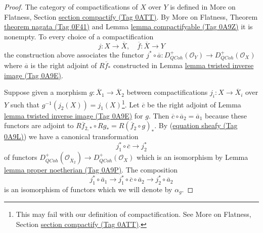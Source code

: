 \documentclass{amsart}
\theoremstyle{plain}
\theoremstyle{definition}
\theoremstyle{remark}
\numberwithin{equation}{subsection}
\def\QCoh{\mathit{QCoh}}
\begin{document}
\begin{proof}
The category of compactifications of $X$ over $Y$ is defined
in More on Flatness, Section \href{https://stacks.math.columbia.edu/tag/0ATT}{section compactify (Tag 0ATT)}.
By More on Flatness, Theorem \href{https://stacks.math.columbia.edu/tag/0F41}{theorem nagata (Tag 0F41)} and
Lemma \href{https://stacks.math.columbia.edu/tag/0A9Z}{lemma compactifyable (Tag 0A9Z)} it is nonempty.
To every choice of a compactification
$$
j : X \to \overline{X},\quad \overline{f} : \overline{X} \to Y
$$
the construction above associates the functor $j^* \circ \overline{a} :
D_\QCoh^+(\mathcal{O}_Y) \to D_\QCoh^+(\mathcal{O}_X)$
where $\overline{a}$ is the right adjoint of $R\overline{f}_*$
constructed in Lemma \href{https://stacks.math.columbia.edu/tag/0A9E}{lemma twisted inverse image (Tag 0A9E)}.

\medskip\noindent
Suppose given a morphism $g : \overline{X}_1 \to \overline{X}_2$
between compactifications $j_i : X \to \overline{X}_i$ over $Y$
such that $g^{-1}(j_2(X)) = j_1(X)$\footnote{This may fail
with our definition of compactification. See
More on Flatness, Section \href{https://stacks.math.columbia.edu/tag/0ATT}{section compactify (Tag 0ATT)}.}.
Let $\overline{c}$ be the right adjoint of
Lemma \href{https://stacks.math.columbia.edu/tag/0A9E}{lemma twisted inverse image (Tag 0A9E)} for $g$.
Then $\overline{c} \circ \overline{a}_2 = \overline{a}_1$
because these functors are adjoint to
$R\overline{f}_{2, *} \circ Rg_* = R(\overline{f}_2 \circ g)_*$.
By (\href{https://stacks.math.columbia.edu/tag/0A9L}{equation sheafy (Tag 0A9L)}) we have a canonical transformation
$$
j_1^* \circ \overline{c} \longrightarrow j_2^*
$$
of functors
$D^+_\QCoh(\mathcal{O}_{\overline{X}_2}) \to D^+_\QCoh(\mathcal{O}_X)$
which is an isomorphism by Lemma \href{https://stacks.math.columbia.edu/tag/0A9P}{lemma proper noetherian (Tag 0A9P)}.
The composition
$$
j_1^* \circ \overline{a}_1 \longrightarrow
j_1^* \circ \overline{c} \circ \overline{a}_2 \longrightarrow
j_2^* \circ \overline{a}_2
$$
is an isomorphism of functors which we will denote by $\alpha_g$.


\end{proof}
\end{document}
